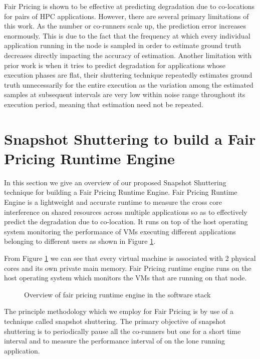 \documentclass[pageno]{jpaper}
\begin{document}
Fair Pricing is shown to be effective at predicting degradation due to co-locations for pairs of HPC applications. However, there are several primary limitations of this work. As the number or co-runners scale up, the prediction error increases enormously. This is due to the fact that the frequency at which every individual application running in the node is sampled in order to estimate ground truth decreases directly impacting the accuracy of estimation. Another limitation with prior work is when it tries to predict degradation for applications whose execution phases are flat, their shuttering technique repeatedly estimates ground truth unnecessarily for the entire execution as the variation among the estimated samples at subsequent intervals are very low within noise range throughout its execution period, meaning that estimation need not be repeated.
\section{Snapshot Shuttering to build a Fair Pricing Runtime Engine}
\label{sec:SnapshotShutteringtobuildaFairPricingRuntimeEngine}

In this section we give an overview of our proposed Snapshot Shuttering technique for building a Fair Pricing Runtime Engine. Fair Pricing Runtime Engine is a lightweight and accurate runtime to measure the cross core interference on shared resources across multiple applications so as to effectively predict the degradation due to co-location. It runs on top of the host operating system monitoring the performance of VMs executing different applications belonging to different users as shown in Figure \ref{fig:FPRE_stack}.

From Figure \ref{fig:FPRE_stack} we can see that every virtual machine is associated with 2 physical cores and its own private main memory. Fair Pricing runtime engine runs on the host operating system which monitors the VMs that are running on that node.
\begin{figure}
\centering
\begin{minipage}[t]{1\columnwidth}
\centering
{}
\caption{Overview of fair pricing runtime engine in the software stack\vspace{-3 mm}}
\label{fig:FPRE_stack}
\end{minipage}
\end{figure}

The principle methodology which we employ for Fair Pricing is by use of a technique called snapshot shuttering. The primary objective of snapshot shuttering is to periodically pause all the co-runners but one for a short time interval and to measure the performance interval of on the lone running application.
\end{document}
